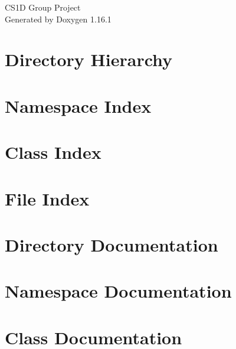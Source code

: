\documentclass[twoside]{book}
\newcommand{\+}{\discretionary{\mbox{\scriptsize$\hookleftarrow$}}{}{}}
\newcommand{\clearemptydoublepage}{%
    \newpage{\pagestyle{empty}\cleardoublepage}%
  }
\begin{document}
  \raggedbottom
    \hypersetup{pageanchor=false,
                bookmarksnumbered=true,
                pdfencoding=unicode
               }
  \begin{titlepage}
  \vspace*{7cm}
  \begin{center}%
  {\Large CS1\+D Group Project}\\
  \vspace*{1cm}
  {\large Generated by Doxygen 1.16.1}\\
  \end{center}
  \end{titlepage}
  \clearemptydoublepage
  \tableofcontents
  \clearemptydoublepage
  \hypersetup{pageanchor=true}
\chapter{Directory Hierarchy}

\chapter{Namespace Index}

\chapter{Class Index}

\chapter{File Index}

\chapter{Directory Documentation}







\chapter{Namespace Documentation}


\chapter{Class Documentation}















\end{document}
